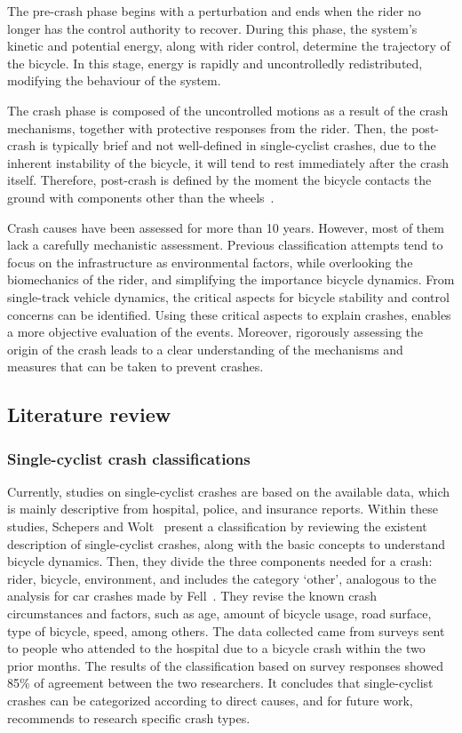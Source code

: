 \documentclass{article}
\begin{document}
The pre-crash phase begins with a perturbation and ends when the rider no longer has the control authority to recover.
%
During this phase, the system's kinetic and potential energy, along with rider control, determine the trajectory of the bicycle.
%
In this stage, energy is rapidly and uncontrolledly redistributed, modifying the behaviour of the system.


The crash phase is composed of the uncontrolled motions as a result of the crash mechanisms, together with protective responses from the rider.
%
Then, the post-crash is typically brief and not well-defined in single-cyclist crashes, due to the inherent instability of the bicycle, it will tend to rest immediately after the crash itself.
%
Therefore, post-crash is defined by the moment the bicycle contacts the ground with components other than the wheels~\cite{Llo16}.


Crash causes have been assessed for more than 10 years.
%
However, most of them lack a carefully mechanistic assessment.
%
Previous classification attempts tend to focus on the infrastructure as environmental factors, while overlooking the biomechanics of the rider, and simplifying the importance bicycle dynamics.
%
From single-track vehicle dynamics, the critical aspects for bicycle stability and control concerns can be identified.
%
Using these critical aspects to explain crashes, enables a more objective evaluation of the events.
%
Moreover, rigorously assessing the origin of the crash leads to a clear understanding of the mechanisms and measures that can be taken to prevent crashes.

\subsection{Literature review}
%
\subsubsection{Single-cyclist crash classifications} \label{subsec: classifications}
%
Currently, studies on single-cyclist crashes are based on the available data, which is mainly descriptive from hospital, police, and insurance reports.
%
Within these studies, Schepers and Wolt~\cite{Sch12} present a classification by reviewing the existent description of single-cyclist crashes, along with the basic concepts to understand bicycle dynamics.
%
Then, they divide the three components needed for a crash: rider, bicycle, environment, and includes the category `other', analogous to the analysis for car crashes made by Fell~\cite{Fel76}.
%
They revise the known crash circumstances and factors, such as age, amount of bicycle usage, road surface, type of bicycle, speed, among others.
%
The data collected came from surveys sent to people who attended to the hospital due to a bicycle crash within the two prior months.
%
The results of the classification based on survey responses showed 85\% of agreement between the two researchers.
%
It concludes that single-cyclist crashes can be categorized according to direct causes, and for future work, recommends to research specific crash types.
\end{document}
